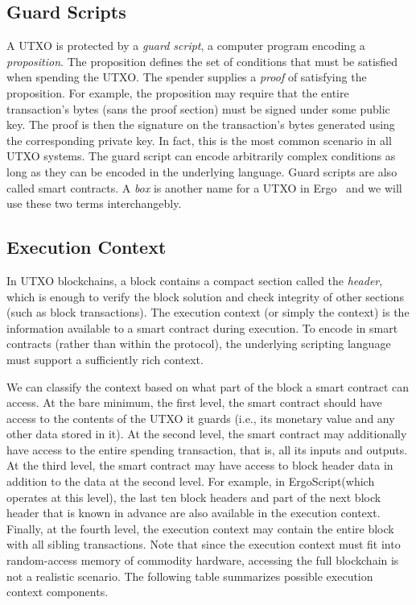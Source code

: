 \documentclass[runningheads]{llncs}
\newcommand{\langname}{ErgoScript\xspace}
\begin{document}
\subsection{Guard Scripts}
A UTXO is protected by a {\em guard script}, a computer program encoding a {\em proposition}. The proposition defines the set of conditions that must be satisfied when spending the UTXO. The spender supplies a {\em proof} of satisfying the proposition. For example, the proposition may require that the entire transaction's bytes (sans the proof section) must be signed under some public key. The proof is then the signature on the transaction's bytes generated using the corresponding private key. In fact, this is the most common scenario in all UTXO systems. 
The guard script can encode arbitrarily complex conditions as long as they can be encoded in the underlying language. 
Guard scripts are also called smart contracts. A {\em box} is another name for a UTXO in Ergo~\cite{ergo} and we will use these two terms interchangebly.

\subsection{Execution Context}
\label{context}

In UTXO blockchains, a block contains a compact section called the {\em header}, which is
enough to verify the block solution and check integrity of other sections (such as block transactions). 
The execution context (or simply the context) is the information available to a smart contract during execution. 
To encode \algname in smart contracts (rather than within the protocol), the underlying scripting language must support  a sufficiently rich context.

We can classify the context based on what part of the block a smart contract can access. At the bare minimum, the first level, the smart contract should have access to the contents of the UTXO it guards (i.e., its monetary value and any other data stored in it). At the second level, the smart contract may additionally have access to the entire spending transaction, that is, all its inputs and outputs. At the third level, the smart contract may have access to block header data in addition to the data at the second level. For example, in \langname (which operates at this level), the last ten block headers and part of the next block header that is known in advance are also available in the execution context. Finally, at the fourth level, the execution context may contain the entire block with all sibling transactions. Note that since the execution context must fit into random-access memory of commodity hardware, accessing the full blockchain is not a realistic scenario. The following
 table summarizes possible execution context components.
\end{document}
